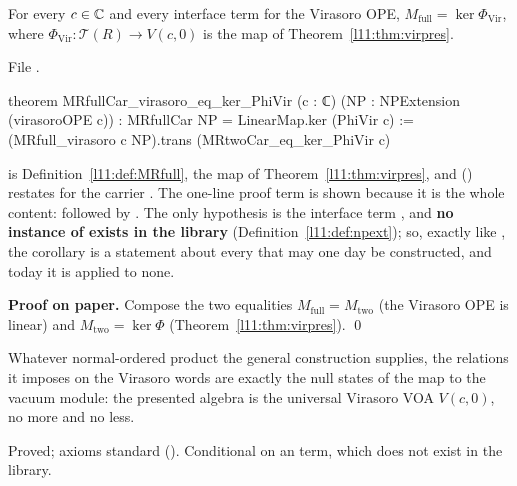 \begin{corollary}[$M_{\mathrm{full}}=\ker\Phi$ for Virasoro, over the interface]\label{l11:cor:MRfullker}
For every $c\in{\mathbb{C}}$ and every interface term  for the Virasoro OPE, $M_{\mathrm{full}}=\ker\Phi_{\mathrm{Vir}}$, where
$\Phi_{\mathrm{Vir}}:\mathcal T(R)\to V(c,0)$ is the map of Theorem~\ref{l11:thm:virpres}.
\end{corollary}
\noindent File .
\begin{leancode}
theorem MRfullCar_virasoro_eq_ker_PhiVir (c : ℂ) (NP : NPExtension (virasoroOPE c)) :
    MRfullCar NP = LinearMap.ker (PhiVir c) :=
  (MRfull_virasoro c NP).trans (MRtwoCar_eq_ker_PhiVir c)
\end{leancode}
\begin{dictionary}
 is Definition~\ref{l11:def:MRfull},  the map of Theorem~\ref{l11:thm:virpres}, and
 () restates
 for the carrier . The one-line proof term is shown because it is the whole content:
 followed by . The only hypothesis is the interface term
, and \textbf{no instance of  exists in the library}
(Definition~\ref{l11:def:npext}); so, exactly like , the corollary is a statement about every
 that may one day be constructed, and today it is applied to none.
\end{dictionary}
\textbf{Proof on paper.} Compose the two equalities $M_{\mathrm{full}}=M_{\mathrm{two}}$ (the Virasoro OPE is linear) and
$M_{\mathrm{two}}=\ker\Phi$ (Theorem~\ref{l11:thm:virpres}). \qed
\begin{physics}
Whatever normal-ordered product the general construction supplies, the relations it imposes on the Virasoro words are exactly the
null states of the map to the vacuum module: the presented algebra is the universal Virasoro VOA $V(c,0)$, no more and no less.
\end{physics}
\begin{status}
Proved; axioms standard (). Conditional on an  term, which does
not exist in the library.
\end{status}

